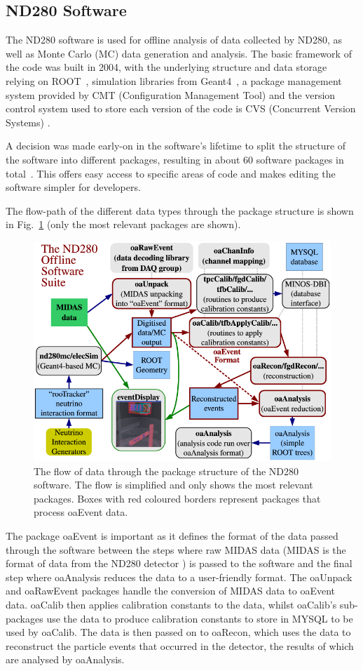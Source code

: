 \documentclass[aps,pra,12pt,notitlepage,tightenlines]{revtex4-1}
\begin{document}
\subsection{ND280 Software}
The ND280 software is used for offline analysis of data collected by ND280, as well as Monte Carlo (MC) data generation and analysis. The basic framework of the code was built in 2004, with the underlying structure and data storage relying on ROOT~\cite{Brun1997}, simulation libraries from Geant4~\cite{Agostinelli2003}, a package management system provided by CMT (Configuration Management Tool) \cite{Arnault:2000vu} and the version control system used to store each version of the code is CVS (Concurrent Version Systems) \cite{Berliner2001}.

A decision was made early-on in the software's lifetime to split the structure of the software into different packages, resulting in about 60 software packages in total~\cite{ABE2011106}. This offers easy access to specific areas of code and makes editing the software simpler for developers. 

The flow-path of the different data types through the package structure is shown in Fig.\ \ref{fig:struct} (only the most relevant packages are shown). 
\begin{figure}
 \includegraphics[scale=0.5]{struct.png}
 \caption{The flow of data through the package structure of the ND280 software. The flow is simplified and only shows the most relevant packages. Boxes with red coloured borders represent packages that process oaEvent data.~\cite{ABE2011106}}
 \label{fig:struct}
\end{figure}
The package oaEvent is important as it defines the format of the data passed through the software between the steps where raw MIDAS data (MIDAS is the format of data from the ND280 detector \cite{Ritt2001}) is passed to the software and the final step where oaAnalysis reduces the data to a user-friendly format. The oaUnpack and oaRawEvent packages handle the conversion of MIDAS data to oaEvent data. oaCalib then applies calibration constants to the data, whilst oaCalib's sub-packages use the data to produce calibration constants to store in MYSQL to be used by oaCalib. The data is then passed on to oaRecon, which uses the data to reconstruct the particle events that occurred in the detector, the results of which are analysed by oaAnalysis.
\end{document}
